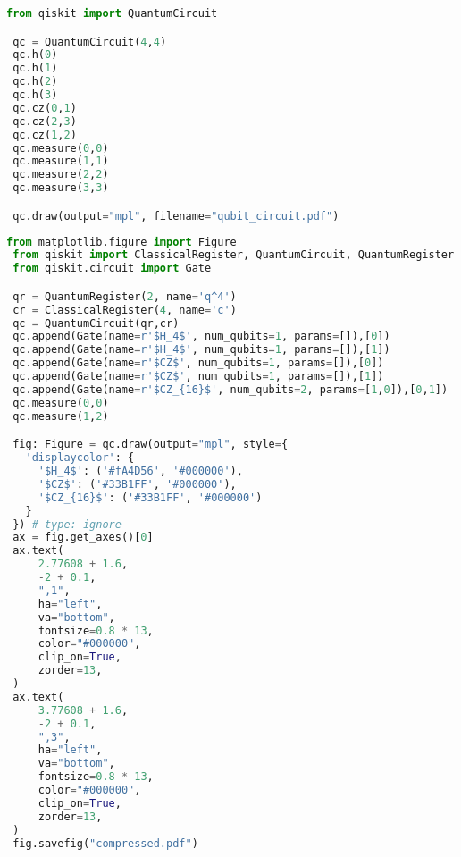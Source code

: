   \begin{lstlisting}[language=Python,caption=Source code fore Figure \ref{fig:compression_qubit_circuit},label=lst:compression_qubit_circuit_source]
 from qiskit import QuantumCircuit

 qc = QuantumCircuit(4,4)
 qc.h(0)
 qc.h(1)
 qc.h(2)
 qc.h(3)
 qc.cz(0,1)
 qc.cz(2,3)
 qc.cz(1,2)
 qc.measure(0,0)
 qc.measure(1,1)
 qc.measure(2,2)
 qc.measure(3,3)

 qc.draw(output="mpl", filename="qubit_circuit.pdf")
  \end{lstlisting}
  \begin{lstlisting}[language=Python,caption=Source code fore Figure \ref{fig:compressed_ququart_circuit},label=lst:compression_ququart_circuit_source]
 from matplotlib.figure import Figure
 from qiskit import ClassicalRegister, QuantumCircuit, QuantumRegister
 from qiskit.circuit import Gate

 qr = QuantumRegister(2, name='q^4')
 cr = ClassicalRegister(4, name='c')
 qc = QuantumCircuit(qr,cr)
 qc.append(Gate(name=r'$H_4$', num_qubits=1, params=[]),[0])
 qc.append(Gate(name=r'$H_4$', num_qubits=1, params=[]),[1])
 qc.append(Gate(name=r'$CZ$', num_qubits=1, params=[]),[0])
 qc.append(Gate(name=r'$CZ$', num_qubits=1, params=[]),[1])
 qc.append(Gate(name=r'$CZ_{16}$', num_qubits=2, params=[1,0]),[0,1])
 qc.measure(0,0)
 qc.measure(1,2)

 fig: Figure = qc.draw(output="mpl", style={
   'displaycolor': {
     '$H_4$': ('#fA4D56', '#000000'),
     '$CZ$': ('#33B1FF', '#000000'),
     '$CZ_{16}$': ('#33B1FF', '#000000')
   }
 }) # type: ignore
 ax = fig.get_axes()[0]
 ax.text(
     2.77608 + 1.6,
     -2 + 0.1,
     ",1",
     ha="left",
     va="bottom",
     fontsize=0.8 * 13,
     color="#000000",
     clip_on=True,
     zorder=13,
 )
 ax.text(
     3.77608 + 1.6,
     -2 + 0.1,
     ",3",
     ha="left",
     va="bottom",
     fontsize=0.8 * 13,
     color="#000000",
     clip_on=True,
     zorder=13,
 )
 fig.savefig("compressed.pdf")
  \end{lstlisting}
